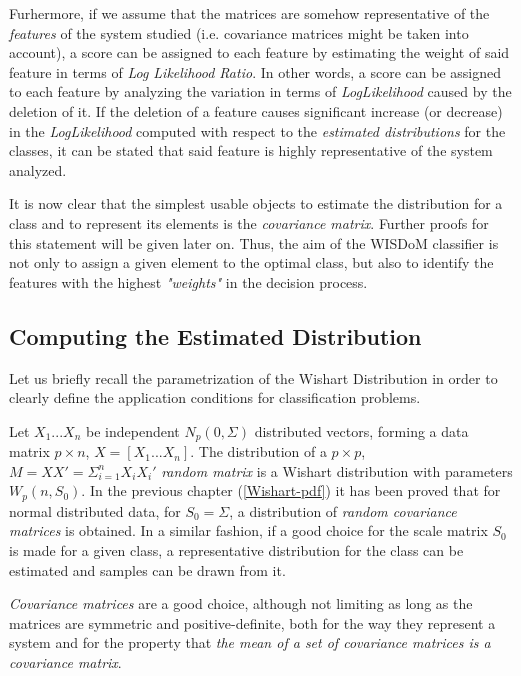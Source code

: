\documentclass[12pt,openright,twoside,a4paper]{book}
\begin{document}
Furhermore, if we assume that the matrices are somehow representative of the \textit{features} of the system studied (i.e. covariance  matrices might be taken into account), a score can be assigned to each feature by estimating the weight of said feature in terms of \textit{Log Likelihood Ratio}.
In other words, a score can be assigned to each feature by analyzing the variation in terms of \textit{LogLikelihood} caused by the deletion of it. 
If the deletion of a feature causes significant increase (or decrease) in the \textit{LogLikelihood} computed with respect to the \textit{estimated distributions} for the classes, it can be stated that said feature is highly representative of the system analyzed.

It is now clear that the simplest usable objects to estimate the distribution for a class and to represent its elements is the \textit{covariance  matrix}. Further proofs for this statement will be given later on.
Thus, the aim of the WISDoM classifier is not only to assign a given element to the optimal class, but also to identify the features with the highest \textit{"weights"} in the decision process.

\subsection{Computing the Estimated Distribution}

Let us briefly recall the parametrization of the Wishart Distribution in order to clearly define the application conditions for classification problems.

Let $X_1...X_n$ be independent $N_p(0,\Sigma)$ distributed vectors, forming a data matrix $p\times n$, $X=[X_1...X_n]$.
The distribution of  a $p\times p$, $M=XX'=\Sigma^n_{i=1}X_iX_i'$ \textit{random matrix}  is a Wishart distribution with parameters $W_p (n, S_0 )$. In the previous chapter (\ref{Wishart-pdf}) it has been proved that for normal distributed data, for $S_0=\Sigma$, a distribution of \textit{random covariance matrices} is obtained.
In a similar fashion, if a good choice for the scale matrix $S_0$ is made for a given class, a representative distribution for the class can be estimated and samples can be drawn from it.

\textit{Covariance matrices} are a good choice, although not limiting as long as the matrices are symmetric and positive-definite, both for the way they represent a system and for the property that \textit{the mean of a set of covariance matrices is a covariance matrix}. 
\end{document}
